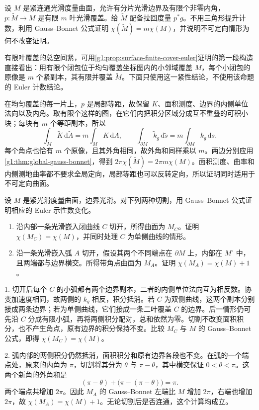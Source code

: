 \begin{exercise}\label{g1:ex:gb-finite-cover}
	设 \(M\) 是紧连通光滑度量曲面，允许有分片光滑边界及有限个非零内角，\(p:\widetilde M\to M\) 是有限 \(m\) 叶光滑覆盖。给 \(\widetilde M\) 配备拉回度量 \(p^*g\)。不用三角形提升计数，利用 Gauss--Bonnet 公式证明 \(\chi(\widetilde M)=m\chi(M)\)，并说明不可定向情形为何不改变证明。
\end{exercise}
\begin{solution}
	有限叶覆盖的总空间紧，可用\cref{g1:prop:surface-finite-cover-euler}证明的第一段构造直接看出：用有限个闭包位于均匀覆盖坐标图内的小邻域覆盖 \(M\)，每个小闭包的原像是 \(m\) 个紧副本，其有限并覆盖 \(\widetilde M\)。下面只使用这一紧性结论，不使用该命题的 Euler 计数结论。

	在均匀覆盖的每一片上，\(p\) 是局部等距，故保留 \(K\)、面积测度、边界的内侧单位法向以及内角。取有限个这样的图，在它们内把积分区域分成互不重叠的可积小块；每块有 \(m\) 个等距副本，所以
	\[
		\int_{\widetilde M}\widetilde K\,\mathrm{d}\widetilde A=m\int_MK\,\mathrm{d}A,
		\qquad
		\int_{\partial\widetilde M}\widetilde k_g\,\mathrm{d}\widetilde s=m\int_{\partial M}k_g\,\mathrm{d}s.
	\]
	每个角点也恰有 \(m\) 个原像，且其外角相同，故外角和同样乘以 \(m\)。两边分别应用\cref{g1:thm:global-gauss-bonnet}，得到 \(2\pi\chi(\widetilde M)=2\pi m\chi(M)\)。面积测度、曲率和内侧测地曲率都不要求全局定向，局部等距也可以反转定向，所以证明同时适用于不可定向曲面。
\end{solution}

\begin{exercise}\label{g1:ex:gb-cutting}
	设 \(M\) 是紧光滑度量曲面，边界光滑。对下列两种切割，用 Gauss--Bonnet 公式证明相应的 Euler 示性数变化。
	\begin{enumerate}
		\item 沿内部一条光滑嵌入闭曲线 \(C\) 切开，所得曲面为 \(M_C\)。证明 \(\chi(M_C)=\chi(M)\)，并同时处理 \(C\) 为单侧曲线的情形。
		\item 沿一条光滑嵌入弧 \(A\) 切开，假设其两个不同端点在 \(\partial M\) 上，内部在 \(M^\circ\) 中，且两端都与边界横交。所得带角点曲面为 \(M_A\)。证明 \(\chi(M_A)=\chi(M)+1\)。
	\end{enumerate}
\end{exercise}
\begin{solution}
	1. 切开后每个 \(C\) 的小弧都有两个边界副本，二者的内侧单位法向互为相反数。协变加速度相同，故两侧的 \(k_g\) 相反，积分抵消。若 \(C\) 为双侧曲线，这两个副本分别接成两条边界；若为单侧曲线，它们接成一条二叶覆盖 \(C\) 的边界。后一情形仍可先沿 \(C\) 分成有限小弧，再将两侧积分配对，总和依然为零。切割不改变面积积分，也不产生角点，原有边界的积分保持不变。比较 \(M_C\) 与 \(M\) 的 Gauss--Bonnet 公式，即得 \(\chi(M_C)=\chi(M)\)。

	2. 弧内部的两侧积分仍然抵消，面积积分和原有边界各段也不变。在弧的一个端点处，原来的内角为 \(\pi\)，切割将其分为 \(\theta\) 与 \(\pi-\theta\)，其中横交保证 \(0<\theta<\pi\)。这两个新角的外角和是
	\[
		(\pi-\theta)+\bigl(\pi-(\pi-\theta)\bigr)=\pi.
	\]
	两个端点共增加 \(2\pi\)。因此 \(M_A\) 的 Gauss--Bonnet 左端比 \(M\) 增加 \(2\pi\)，右端也增加 \(2\pi\)，故 \(\chi(M_A)=\chi(M)+1\)。无论切割后是否连通，这个计算均成立。
\end{solution}

